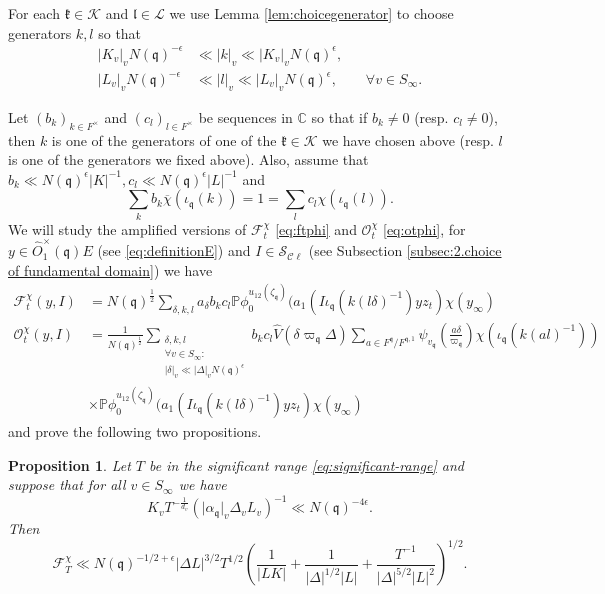 \documentclass[a4paper,11pt]{amsart}
\newtheorem{proposition}[theorem]{Proposition}
\theoremstyle{definition}
\newcommand{\cl}{\mathcal{C}\ell}
\newcommand{\CC}{\mathbb{C}}
\begin{document}
For each $\mathfrak{k}\in \mathcal{K}$ and $\mathfrak{l} \in \mathcal{L}$ we use Lemma \ref{lem:choicegenerator} to choose generators $k,l$ so that 
\begin{align*}\vert{K_v}\vert_v N(\mathfrak{q})^{-\epsilon}&\ll\vert{k}\vert_v \ll \vert{K_v}\vert_v N(\mathfrak{q})^{\epsilon}, \\
\vert{L_v}\vert_v N(\mathfrak{q})^{-\epsilon}&\ll\vert{l}\vert_v \ll \vert{L_v}\vert_vN(\mathfrak{q})^{\epsilon}, \qquad \forall v \in S_{\infty}.\end{align*}


Let $(b_k)_{k\in F^{\times}}$ and $(c_l)_{l\in F^{\times}}$ be sequences in $\CC$ so that if $b_k \neq 0$ (resp. $c_l \neq 0$), then $k$ is one of the generators of one of the $\mathfrak{k} \in \mathcal{K}$ we have chosen above (resp. $l$ is one of the generators we fixed above). Also, assume that $b_k \ll N(\mathfrak{q})^{\epsilon}\vert{K}\vert^{-1}, c_l\ll N(\mathfrak{q})^{\epsilon}\vert{L}\vert^{-1}$ and
\[\sum_{k}b_k\overline{\chi}(\iota_{\mathfrak{q}}(k)) =  1 = \sum_{l}c_l\chi(\iota_{\mathfrak{q}}(l)).\]
We will study the amplified versions of $\mathcal{F}^{\chi}_t$ \eqref{eq:ftphi} and $\mathcal{O}^{\chi}_t$ \eqref{eq:otphi}, for $y\in \widehat{O}^\times_1(\mathfrak{q}) E$ (see \eqref{eq:definitionE}) and $I \in \mathcal{S}_{\cl}$ (see Subsection \ref{subsec:2.choice of fundamental domain}) we have
\begin{align}
    \mathcal{F}_t^{\chi}(y,I) 
    &={N(\mathfrak{q})^{\frac{1}{2}}}\sum_{\delta,k,l}a_{\delta}b_kc_l\mathbb{P}\phi_0^{u_{12}(\zeta_{\mathfrak{q}})}(a_1(I\iota_{\mathfrak{q}}(k(l\delta)^{-1})yz_t)\chi(y_{\infty})  \\
    \mathcal{O}^{\chi}_t(y,I)&=\frac{1}{N(\mathfrak{q})^{\frac{1}{2}}}\sum_{\substack{\delta,k,l\\ \forall v \in S_{\infty}:\\\vert{\delta}\vert_v \ll \vert{\Delta}\vert_vN(\mathfrak{q})^{\epsilon}}}b_kc_l\widehat{V}\left(\delta\varpi_\mathfrak{q}\Delta\right)\sum_{a\in F^{\mathfrak{q}}/F^{\mathfrak{q,1}}}\psi_{v_{\mathfrak{q}}}\left(\frac{a\delta}{\varpi_{\mathfrak{q}}}\right)\chi(\iota_{\mathfrak{q}}(k(al)^{-1}))\nonumber\\&\times\mathbb{P}\phi_0^{u_{12}(\zeta_{\mathfrak{q}})}(a_1(I\iota_{\mathfrak{q}}(k(l\delta)^{-1})yz_t)\chi(y_{\infty}) 
\end{align}
and prove the following two propositions.

\begin{proposition}\label{prop:boundF}
     Let $T$ be in the significant range \eqref{eq:significant-range} and suppose that for all $v\in S_{\infty}$ we have \begin{equation}\label{eq:choicedelta_v}K_vT^{-\frac{1}{d_v}}(\vert \alpha_\mathfrak{q}\vert_v\Delta_vL_v)^{-1} \ll N(\mathfrak{q})^{-4\epsilon}.\end{equation} Then 
    \[\mathcal{F}^{\chi}_T \ll N(\mathfrak{q})^{-1/2+\epsilon}\vert{\Delta L}\vert^{3/2}T^{1/2}\left(\frac{1}{\vert{LK}\vert} + \frac{1}{\vert\Delta\vert^{1/2} \vert L\vert}+\frac{T^{-1}}{\vert\Delta\vert^{5/2}\vert L\vert ^2}\right)^{1/2}. \]
    
\end{proposition}
\end{document}
